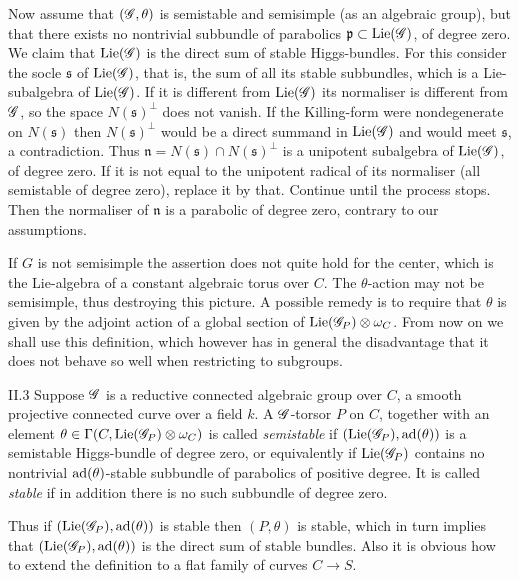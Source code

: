 \documentclass[12pt,english]{smfart}
\theoremstyle{plain} \newtheorem{innerthm}{Theorem} \newtheorem{innerlem}{Lemma} \newtheorem{innerprop}{Proposition} \newtheorem{innercor}{Corollary} \theoremstyle{definition} \newtheorem{innerdefn}{Definition} \newtheorem{innerconstr}{Construction} \theoremstyle{remark} \newtheorem*{remark}{Remark} \newtheorem*{remarks}{Remarks} \newtheorem*{applications}{Applications}
\begin{document}
Now assume that $(\mathscr{G},\theta)$ is semistable and semisimple (as an algebraic group), but that there exists no nontrivial subbundle of parabolics $\mathfrak{p}\subset\operatorname{Lie}(\mathscr{G})$, of degree zero. We claim that $\operatorname{Lie}(\mathscr{G})$ is the direct sum of stable Higgs-bundles. For this consider the socle $\mathfrak{s}$ of $\operatorname{Lie}(\mathscr{G})$, that is, the sum of all its stable subbundles, which is a Lie-subalgebra of $\operatorname{Lie}(\mathscr{G})$. If it is different from $\operatorname{Lie}(\mathscr{G})$ its normaliser is different from $\mathscr{G}$, so the space $N(\mathfrak{s})^\perp$ does not vanish. If the Killing-form were nondegenerate on $N(\mathfrak{s})$ then $N(\mathfrak{s})^\perp$ would be a direct summand in $\operatorname{Lie}(\mathscr{G})$ and would meet $\mathfrak{s}$, a contradiction. Thus $\mathfrak{n}=N(\mathfrak{s})\cap N(\mathfrak{s})^\perp$ is a unipotent subalgebra of $\operatorname{Lie}(\mathscr{G})$, of degree zero. If it is not equal to the unipotent radical of its normaliser (all semistable of degree zero), replace it by that. Continue until the process stops. Then the normaliser of $\mathfrak{n}$ is a parabolic of degree zero, contrary to our assumptions.


If $G$ is not semisimple the assertion does not quite hold for the center, which is the Lie-algebra of a constant algebraic torus over $C$. The $\theta$-action may not be semisimple, thus destroying this picture. A possible remedy is to require that $\theta$ is given by the adjoint action of a global section of $\operatorname{Lie}(\mathscr{G}_P)\otimes\omega_C$. From now on we shall use this definition, which however has in general the disadvantage that it does not behave so well when restricting to subgroups.

\begin{definition}{II.3}\label{def:II.3}
Suppose $\mathscr{G}$ is a reductive connected algebraic group over $C$, a smooth projective connected curve over a field $k$. A $\mathscr{G}$-torsor $P$ on $C$, together with an element $\theta\in\Gamma(C,\operatorname{Lie}(\mathscr{G}_P)\otimes\omega_C)$ is called \emph{semistable} if $(\operatorname{Lie}(\mathscr{G}_P),\operatorname{ad}(\theta))$ is a semistable Higgs-bundle of degree zero, or equivalently if $\operatorname{Lie}(\mathscr{G}_P)$ contains no nontrivial $\operatorname{ad}(\theta)$-stable subbundle of parabolics of positive degree. It is called \emph{stable} if in addition there is no such subbundle of degree zero.
\end{definition}

Thus if $(\operatorname{Lie}(\mathscr{G}_P),\operatorname{ad}(\theta))$ is stable then $(P,\theta)$ is stable, which in turn implies that $(\operatorname{Lie}(\mathscr{G}_P),\operatorname{ad}(\theta))$ is the direct sum of stable bundles. Also it is obvious how to extend the definition to a flat family of curves $C\to S$.
\end{document}

